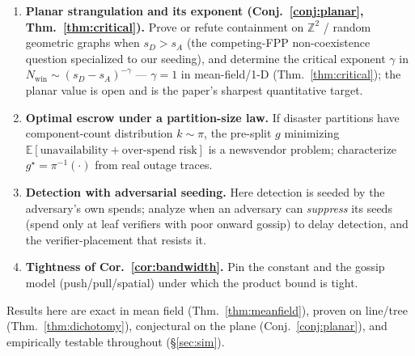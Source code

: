 \documentclass[11pt]{article}
\theoremstyle{plain}
\theoremstyle{definition}
\newcommand{\Nwin}{N_{\mathrm{win}}}
\newcommand{\E}{\mathbb{E}}
\begin{document}
\begin{enumerate}[leftmargin=1.6em,itemsep=1pt]
  \item \textbf{Planar strangulation and its exponent (Conj.~\ref{conj:planar},
  Thm.~\ref{thm:critical}).} Prove or refute containment on $\mathbb{Z}^2$ / random
  geometric graphs when $s_D>s_A$ (the competing-FPP non-coexistence question
  specialized to our seeding), and determine the critical exponent $\gamma$ in
  $\Nwin\sim(s_D-s_A)^{-\gamma}$ --- $\gamma=1$ in mean-field/1-D
  (Thm.~\ref{thm:critical}); the planar value is open and is the paper's sharpest
  quantitative target.
  \item \textbf{Optimal escrow under a partition-size law.} If disaster partitions
  have component-count distribution $k\sim\pi$, the pre-split $g$ minimizing
  $\E[\text{unavailability}+\text{over-spend risk}]$ is a newsvendor problem;
  characterize $g^\star=\pi^{-1}(\cdot)$ from real outage traces.
  \item \textbf{Detection with adversarial seeding.} Here detection is seeded by
  the adversary's own spends; analyze when an adversary can \emph{suppress} its
  seeds (spend only at leaf verifiers with poor onward gossip) to delay detection,
  and the verifier-placement that resists it.
  \item \textbf{Tightness of Cor.~\ref{cor:bandwidth}.} Pin the constant and the
  gossip model (push/pull/spatial) under which the product bound is tight.
\end{enumerate}

Results here are exact in mean field (Thm.~\ref{thm:meanfield}), proven on
line/tree (Thm.~\ref{thm:dichotomy}), conjectural on the plane
(Conj.~\ref{conj:planar}), and empirically testable throughout (\S\ref{sec:sim}).

\small


\end{document}
